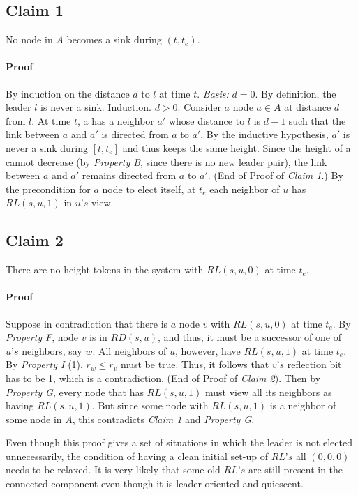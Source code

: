 \documentclass{article}
\begin{document}
\subsection{Claim 1}
No node in $A$ becomes a sink during $(t, t_e)$.

\paragraph{Proof}
By induction on the distance $d$ to $l$ at time $t$.
\textit{Basis:} $d = 0$. By definition, the leader $l$ is never a sink.
Induction. $d > 0$. Consider $a$ node $a ∈ A$ at distance $d$ from $l$. At time $t$, a has a neighbor $a'$ whose distance to $l$ is $d − 1$ such that the link between $a$ and $a'$ is directed from $a$ to $a'$. By the inductive hypothesis, $a'$ is never a sink during $[t,t_e]$ and thus keeps the same height. Since the height of a cannot decrease (by \textit{Property B}, since there is no new leader pair), the link between $a$ and $a'$ remains directed from $a$ to $a'$. (End of Proof of \textit{Claim 1}.)
By the precondition for $a$ node to elect itself, at $t_e$ each neighbor of $u$ has $RL(s, u, 1)$ in $u’s$ view.

\subsection{Claim 2}
There are no height tokens in the system with $RL(s, u, 0)$ at time $t_e$.

\paragraph{Proof}
Suppose in contradiction that there is $a$ node $v$ with $RL(s, u, 0)$ at time $t_e$. By \textit{Property F}, node $v$ is in $RD(s, u)$, and thus, it must be a successor of one of $u’s$ neighbors, say $w$. All neighbors of $u$, however, have $RL(s, u, 1)$ at time $t_e$. By \textit{Property I} (1), $r_w \leq r_v$ must be true.
Thus, it follows that $v’s$ reflection bit has to be 1, which is a contradiction. (End of Proof of \textit{Claim 2}). Then by \textit{Property G}, every node that has $RL(s, u, 1)$ must view all its neighbors as having $RL(s, u, 1)$. But since some node with $RL(s, u, 1)$ is a neighbor of some node in $A$, this contradicts \textit{Claim 1} and \textit{Property G}.

Even though this proof gives a set of situations in which the leader is not elected unnecessarily, the condition of having a clean initial set-up of $RL’s$ all $(0, 0, 0)$ needs to be relaxed. It is very likely that some old $RL’s$ are still present in the connected component even though it is leader-oriented and quiescent.
\end{document}
